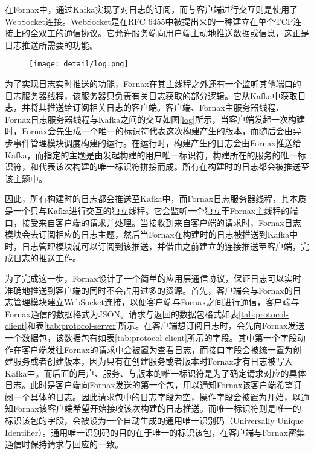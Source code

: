 在Fornax中，通过Kafka实现了对日志的订阅，而与客户端进行交互则是使用了WebSocket连接。WebSocket是在RFC 6455\cite{websocket}中被提出来的一种建立在单个TCP连接上的全双工的通信协议。它允许服务端向用户端主动地推送数据或信息，这正是日志推送所需要的功能。

\begin{figure}[!htp]
  \centering
  \texttt{[image: detail/log.png]}
\end{figure}

为了实现日志实时推送的功能，Fornax在其主线程之外还有一个监听其他端口的日志服务器线程，该服务器只负责有关日志获取的部分逻辑。它从Kafka中获取日志，并将其推送给订阅相关日志的客户端。客户端、Fornax主服务器线程、Fornax日志服务器线程与Kafka之间的交互如图\ref{log}所示，当客户端发起一次构建时，Fornax会先生成一个唯一的标识符代表这次构建产生的版本，而随后会由异步事件管理模块调度构建的运行。在运行时，构建产生的日志会由Fornax推送给Kafka，而指定的主题是由发起构建的用户唯一标识符，构建所在的服务的唯一标识符，和代表该次构建的唯一标识符拼接而成。所有在构建时的日志都会被推送至该主题中。

因此，所有构建时的日志都会推送至Kafka中，而Fornax日志服务器线程，其本质是一个只与Kafka进行交互的独立线程。它会监听一个独立于Fornax主线程的端口，接受来自客户端的请求并处理。当接收到来自客户端的请求时，Fornax日志模块会去订阅相应的日志主题，然后当Fornax在构建时的日志被推送到Kafka中时，日志管理模块就可以订阅到该推送，并借由之前建立的连接推送至客户端，完成日志的推送工作。

为了完成这一步，Fornax设计了一个简单的应用层通信协议，保证日志可以实时准确地推送到客户端的同时不会占用过多的资源。首先，客户端会与Fornax的日志管理模块建立WebSocket连接，以便客户端与Fornax之间进行通信，客户端与Fornax通信的数据格式为JSON。请求与返回的数据包格式如表\ref{tab:protocol-client}和表\ref{tab:protocol-server}所示。在客户端想订阅日志时，会先向Fornax发送一个数据包，该数据包有如表\ref{tab:protocol-client}所示的字段。其中第一个字段动作在客户端发往Fornax的请求中会被置为查看日志，而接口字段会被统一置为创建服务或者创建版本，因为只有在创建服务或者版本时Fornax才有日志被写入Kafka中。而后面的用户、服务、与版本的唯一标识符是为了确定请求对应的具体日志。此时是客户端向Fornax发送的第一个包，用以通知Fornax该客户端希望订阅一个具体的日志。因此请求包中的日志字段为空，操作字段会被置为开始，以通知Fornax该客户端希望开始接收该次构建的日志推送。而唯一标识符则是唯一的标识该包的字段，会被设为一个自动生成的通用唯一识别码（Universally Unique Identifier）。通用唯一识别码的目的在于唯一的标识该包，在客户端与Fornax密集通信时保持请求与回应的一致。

